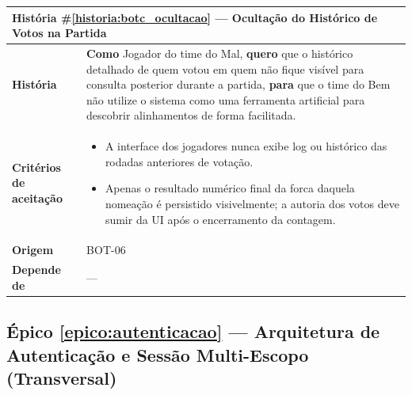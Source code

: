 \documentclass[12pt,a4paper]{article}
\newcounter{epico}
\newcounter{historia}
\begin{document}
\label{historia:botc_ocultacao}
\begin{table}[H]
    \centering
    \begin{tabular}{|m{4.5cm} | m{11cm}|}
    \hline
    \multicolumn{2}{|l|}{\textbf{História \#\ref{historia:botc_ocultacao} --- Ocultação do Histórico de Votos na Partida}} \\
    \hline  \textbf{História} &
    \textbf{Como} Jogador do time do Mal, \newline
    \textbf{quero} que o histórico detalhado de quem votou em quem não fique visível para consulta posterior durante a partida, \newline  
    \textbf{para} que o time do Bem não utilize o sistema como uma ferramenta artificial para descobrir alinhamentos de forma facilitada. \\
    \textbf{Critérios de aceitação} &
    \begin{itemize}
        \item{A interface dos jogadores nunca exibe log ou histórico das rodadas anteriores de votação.}
        \item{Apenas o resultado numérico final da forca daquela nomeação é persistido visivelmente; a autoria dos votos deve sumir da UI após o encerramento da contagem.}
    \end{itemize}\\
    \textbf{Origem} & BOT-06 \\
    \textbf{Depende de} & --- \\
    \hline
    \end{tabular}
\end{table}


\label{epico:autenticacao}
\subsection*{Épico \ref{epico:autenticacao} --- Arquitetura de Autenticação e Sessão Multi-Escopo (Transversal)}
\end{document}
